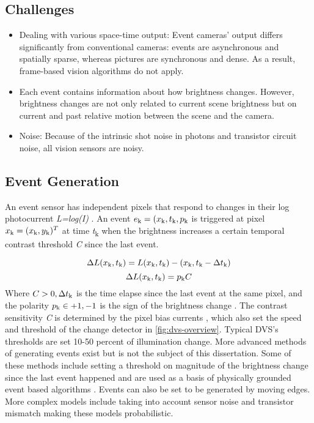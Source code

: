 \documentclass[12pt]{report}
\begin{document}
\subsection{Challenges}
\begin{itemize}
    \item Dealing with various space-time output: Event cameras' output differs significantly from conventional cameras: events are asynchronous and spatially sparse, whereas pictures are synchronous and dense. As a result, frame-based vision algorithms do not apply.
    \item Each event contains information about how brightness changes. However, brightness changes are not only related to current scene brightness but on current and past relative motion between the scene and the camera.
    \item Noise: Because of the intrinsic shot noise in photons and transistor circuit noise, all vision sensors are noisy.
\end{itemize}
\subsection{Event Generation}
An event sensor \cite{Lichtsteiner2008} has independent pixels that respond
to changes in their log photocurrent \textit{L=log(I)} . An event \(e\textsubscript{k}=(x\textsubscript{k},t\textsubscript{k},p\textsubscript{k}\) is triggered at pixel \(x\textsubscript{k}=(x\textsubscript{k},y\textsubscript{k})^T\) at time \textit{t}\textsubscript{k} when the brightness increases a certain temporal contrast threshold \textit{C} since the last event.

\begin{equation}
    \Delta L(x\textsubscript{k},t\textsubscript{k}) = L(x\textsubscript{k},t\textsubscript{k})-(x\textsubscript{k},t\textsubscript{k}-\Delta t\textsubscript{k})
\end{equation}
\begin{equation}
   \Delta L(x\textsubscript{k},t\textsubscript{k}) = p\textsubscript{k}C 
\end{equation}
Where \(C > 0, \Delta t\textsubscript{k}\) is the time elapse since the last event at the same pixel, and the polarity  \(p\textsubscript{k} \in {+1,-1}\) is the sign of the brightness change \cite{Lichtsteiner2008}. The contrast sensitivity \textit{C} is determined by the pixel bias currents \cite{nozaki2017} \cite{Gallego2020}, which also set the speed and threshold of the change detector in \ref{fig:dvs-overview}. Typical DVS's thresholds are set 10-50 percent of illumination change. More advanced methods of generating events exist but is not the subject of this dissertation. Some of these methods include setting a threshold on magnitude of the brightness change since the last event happened and are used as a basis of physically grounded event based algorithms \cite{Gallego2019}. Events can also be set to be generated by moving edges. More complex models include taking into account sensor noise and transistor mismatch making these models probabilistic. 
\end{document}
